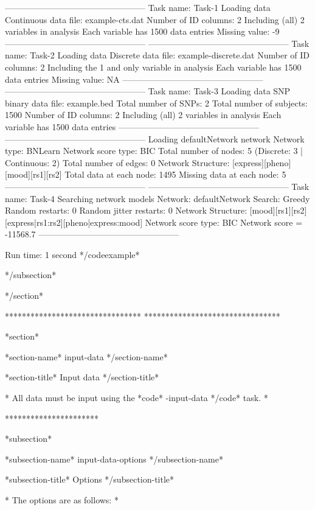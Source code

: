 -------------------------------------------------- Task name: Task-1 Loading data Continuous data file: example-cts.dat Number of ID columns: 2 Including (all) 2 variables in analysis Each variable has 1500 data entries Missing value: -9 -------------------------------------------------- -------------------------------------------------- Task name: Task-2 Loading data Discrete data file: example-discrete.dat Number of ID columns: 2 Including the 1 and only variable in analysis Each variable has 1500 data entries Missing value: NA -------------------------------------------------- -------------------------------------------------- Task name: Task-3 Loading data SNP binary data file: example.bed Total number of SNPs: 2 Total number of subjects: 1500 Number of ID columns: 2 Including (all) 2 variables in analysis Each variable has 1500 data entries -------------------------------------------------- -------------------------------------------------- Loading defaultNetwork network Network type: BNLearn Network score type: BIC Total number of nodes: 5 (Discrete: 3 | Continuous: 2) Total number of edges: 0 Network Structure: [express][pheno][mood][rs1][rs2] Total data at each node: 1495 Missing data at each node: 5 -------------------------------------------------- -------------------------------------------------- Task name: Task-4 Searching network models Network: defaultNetwork Search: Greedy Random restarts: 0 Random jitter restarts: 0 Network Structure: [mood][rs1][rs2][express|rs1:rs2][pheno|express:mood] Network score type: BIC Network score = -11568.7 --------------------------------------------------

Run time: 1 second */codeexample*


*/subsection*


*/section*

******************************** ********************************

*section*

*section-name* input-data */section-name*

*section-title* Input data */section-title*

* All data must be input using the *code* -input-data */code* task. *

**********************

*subsection*

*subsection-name* input-data-options */subsection-name*

*subsection-title* Options */subsection-title*

* The options are as follows: *

